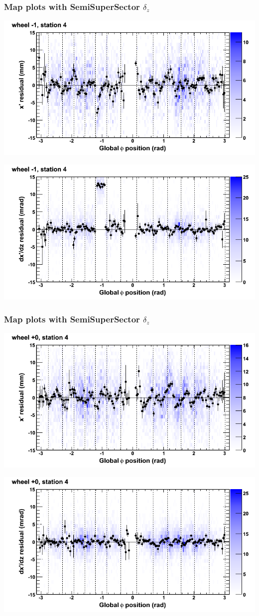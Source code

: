 \documentclass[compress]{beamer}
\begin{document}
\begin{frame}
\frametitle{Map plots with SemiSuperSector $\delta_z$}
\includegraphics[width=0.5\linewidth]{zfit_mapplots/DTvsphi_st4whB_x.png}

\includegraphics[width=0.5\linewidth]{zfit_mapplots/DTvsphi_st4whB_dxdz.png}
\end{frame}

\begin{frame}
\frametitle{Map plots with SemiSuperSector $\delta_z$}
\includegraphics[width=0.5\linewidth]{zfit_mapplots/DTvsphi_st4whC_x.png}

\includegraphics[width=0.5\linewidth]{zfit_mapplots/DTvsphi_st4whC_dxdz.png}
\end{frame}
\end{document}
